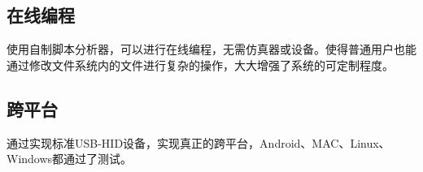 \subsection{在线编程}
使用自制脚本分析器，可以进行在线编程，无需仿真器或设备。使得普通用户也能通过修改文件系统内的文件进行复杂的操作，大大增强了系统的可定制程度。

\subsection{跨平台}
通过实现标准USB-HID设备，实现真正的跨平台，Android、MAC、Linux、Windows都通过了测试。


















